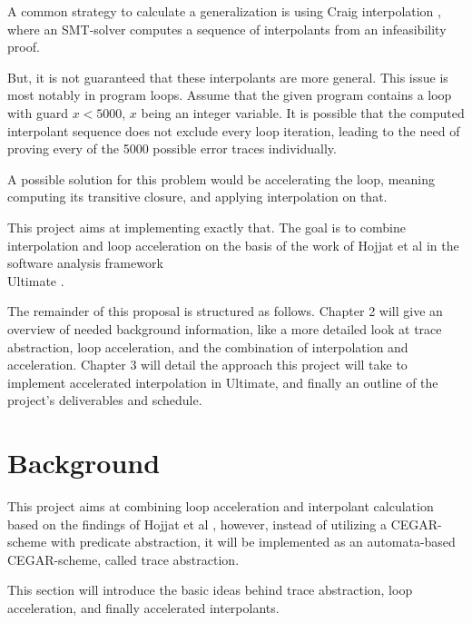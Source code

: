 \documentclass{article}
\begin{document}
A common strategy \cite{10.1007/978-3-642-03237-0_7} to calculate a generalization is using Craig interpolation \cite{craig_1957}, where an SMT-solver computes a sequence of interpolants from an infeasibility proof.\par 
But, it is not guaranteed that these interpolants are more general. This issue is most notably in program loops. Assume that the given program contains a loop with guard $x < 5000$, $x$ being an integer variable. It is possible that the computed interpolant sequence does not exclude every loop iteration, leading to the need of proving every of the 5000 possible error traces individually. \par
A possible solution for this problem would be accelerating the loop, meaning computing its transitive closure, and applying interpolation on that. \par This project aims at implementing exactly that. 
The goal is to combine interpolation and loop acceleration on the basis of the work of Hojjat et al \cite{10.1007/978-3-642-33386-6_16} in the software analysis framework \\ Ultimate \cite{Zitat02}. \par
The remainder of this proposal is structured as follows. Chapter 2 will give an overview of needed background information, like a more detailed look at trace abstraction, loop acceleration, and the combination of interpolation and acceleration. Chapter 3 will detail the approach this project will take to implement accelerated interpolation in Ultimate, and finally an outline of the project's deliverables and schedule.

\section{Background}
This project aims at combining loop acceleration and interpolant calculation based on the findings of Hojjat et al \cite{10.1007/978-3-642-33386-6_16}, however, instead of utilizing a CEGAR-scheme with predicate abstraction, it will be implemented as an automata-based CEGAR-scheme, called trace abstraction. \par
This section will introduce the basic ideas behind trace abstraction, loop acceleration, and finally accelerated interpolants.
\end{document}
